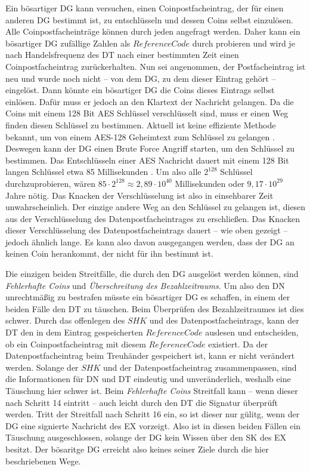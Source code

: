 \documentclass[
	fontsize=11pt,
	headings=small,
	parskip=half,           %
	bibliography=totoc,
	numbers=noenddot,       %
	open=any,               %
]{scrreprt}
\begin{document}
Ein bösartiger DG kann versuchen, einen Coinpostfacheintrag, der für einen anderen DG bestimmt ist, zu entschlüsseln und dessen Coins selbst einzulösen. Alle Coinpostfacheinträge können durch jeden angefragt werden. Daher kann ein bösartiger DG zufällige Zahlen als $ReferenceCode$ durch probieren und wird je nach Handelsfrequenz des DT nach einer bestimmten Zeit einen Coinpostfacheintrag zurückerhalten. Nun sei angenommen, der Postfacheintrag ist neu und wurde noch nicht -- von dem DG, zu dem dieser Eintrag gehört -- eingelöst. Dann könnte ein bösartiger DG die Coins dieses Eintrags selbst einlösen. Dafür muss er jedoch an den Klartext der Nachricht gelangen. Da die Coins mit einem 128 Bit AES Schlüssel verschlüsselt sind, muss er einen Weg finden diesen Schlüssel zu bestimmen. Aktuell ist keine effiziente Methode bekannt, um von einem AES-128 Geheimtext zum Schlüssel zu gelangen \cite{aes-Biryukov2010Key}. Deswegen kann der DG einen Brute Force Angriff starten, um den Schlüssel zu bestimmen. Das Entschlüsseln einer AES Nachricht dauert mit einem 128 Bit langen Schlüssel etwa 85 Millisekunden \cite{aes-Kumar2016Implementation}. Um also alle $2^{128}$ Schlüssel durchzuprobieren, wären $85\cdot 2^{128} \approx 2,89\cdot10^{40}$ Millisekunden oder $9,17\cdot10^{29}$ Jahre nötig. Das Knacken der Verschlüsselung ist also in einsehbarer Zeit unwahrscheinlich. Der einzige andere Weg an den Schlüssel zu gelangen ist, diesen aus der Verschlüsselung des Datenpostfacheintrages zu erschließen. Das Knacken dieser Verschlüsselung des Datenpostfacheintrags dauert -- wie oben gezeigt -- jedoch ähnlich lange. Es kann also davon ausgegangen werden, dass der DG an keinen Coin herankommt, der nicht für ihn bestimmt ist. 

Die einzigen beiden Streitfälle, die durch den DG ausgelöst werden können, sind \textit{Fehlerhafte Coins} und \textit{Überschreitung des Bezahlzeitraums}. Um also den DN unrechtmäßig zu bestrafen müsste ein bösartiger DG es schaffen, in einem der beiden Fälle den DT zu täuschen. Beim Überprüfen des Bezahlzeitraumes ist dies schwer. Durch das offenlegen des $SHK$ und des Datenpostfacheintrags, kann der DT den in dem Eintrag gespeicherten $ReferenceCode$ auslesen und entscheiden, ob ein Coinpostfacheintrag mit diesem $ReferenceCode$ existiert. Da der Datenpostfacheintrag beim Treuhänder gespeichert ist, kann er nicht verändert werden. Solange der $SHK$ und der Datenpostfacheintrag zusammenpassen, sind die Informationen für DN und DT eindeutig und unveränderlich, weshalb eine Täuschung hier schwer ist. Beim \textit{Fehlerhafte Coins} Streitfall kann -- wenn dieser nach Schritt 14 eintritt -- auch leicht durch den DT die Signatur überprüft werden. Tritt der Streitfall nach Schritt 16 ein, so ist dieser nur gülitg, wenn der DG eine signierte Nachricht des EX vorzeigt. Also ist in diesen beiden Fällen ein Täuschung ausgeschlossen, solange der DG kein Wissen über den SK des EX besitzt. Der bösaritge DG erreicht also keines seiner Ziele durch die hier beschriebenen Wege.
\end{document}
